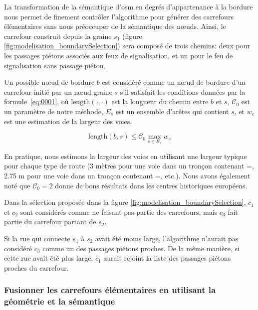 La transformation de la sémantique d'\gls{osm} en degrés d'appartenance à la bordure nous permet de finement contrôler l'algorithme pour générer des carrefours élémentaires sans nous préoccuper de la sémantique des nœuds. Ainsi, le carrefour construit depuis la graine $s_1$ (figure \ref{fig:modelisation_boundarySelection}) sera composé de trois chemins: deux pour les passages piétons associés aux feux de signalisation, et un pour le feu de signalisation sans passage piéton.

\newpar{}

Un possible nœud de bordure $b$ est considéré comme un nœud de bordure d'un carrefour initié par un nœud graine $s$ s’il satisfait les conditions données par la formule~\ref{eq:0001}, où  $\mathrm{length}(\cdot, \cdot)$ est la longueur du chemin entre $b$ et $s$, $\mathcal{C}_0$ est un paramètre de notre méthode, $E_s$ est un ensemble d'arêtes qui contient $s$, et $w_e$ est une estimation de la largeur des voies.

\begin{equation}
 \mathrm{length}(b, s) \leq \mathcal{C}_0 \max_{e \in E_s} w_e
 \label{eq:0001}
\end{equation}

En pratique, nous estimons la largeur des voies en utilisant une largeur typique pour chaque type de route (3 mètres pour une voie dans un tronçon contenant =, 2.75 m pour une voie dans un tronçon contenant =, etc.). Nous avons également noté que $\mathcal{C}_0=2$ donne de bons résultats dans les centres historiques européens.

\newpar{}

Dans la sélection proposée dans la figure \ref{fig:modelisation_boundarySelection}, $c_1$ et $c_2$ sont considérés comme ne faisant pas partie des carrefours, mais $c_3$ fait partie du carrefour partant de $s_2$.

Si la rue qui connecte $s_1$ à $s_2$ avait été moins large, l'algorithme n'aurait pas considéré $c_3$ comme un des passages piétons proches. De la même manière, si cette rue avait été plus large, $c_1$ aurait rejoint la liste des passages piétons proches du carrefour.

\subsubsection{Fusionner les carrefours élémentaires en utilisant la géométrie et la sémantique}

